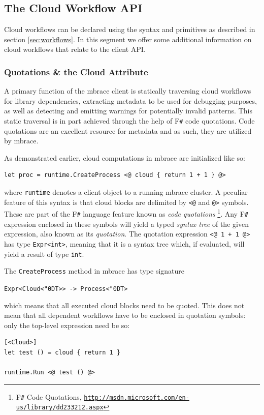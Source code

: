 \documentclass[9pt,a4paper]{article}
\newcommand{\mbrace}{mbrace}
\newcommand{\fsharp}{F\texttt \#}
\newcommand{\samehref}[1]{\href{#1}{\texttt{#1}}}
\newcommand{\centertt}[1]{\begin{center}\texttt{#1}\end{center}}
\newcommand{\uq}{\char"0D}
\begin{document}
\subsection{The Cloud Workflow API}
\label{sec:client:workflows}

Cloud workflows can be declared using the syntax and primitives as described in section \ref{sec:workflows}.
In this segment we offer some additional information on cloud workflows that relate to the client API.

\subsubsection*{Quotations \& the Cloud Attribute}

A primary function of the \mbrace{} client is statically traversing cloud workflows 
for library dependencies, extracting metadata to be used for debugging purposes,
as well as detecting and emitting warnings for potentially invalid patterns. 
This static traversal is in part achieved through the help of \fsharp{} code quotations.
Code quotations are an excellent resource for metadata and as such, they are utilized by \mbrace{}.

As demonstrated earlier, cloud computations in \mbrace{} are initialized like so:
\begin{lstlisting}
let proc = runtime.CreateProcess <@ cloud { return 1 + 1 } @>
\end{lstlisting}
where \texttt{runtime} denotes a client object to a running \mbrace{} cluster.
A peculiar feature of this syntax is that cloud blocks are delimited by \texttt{<@} and 
\texttt{@>} symbols. These are part of the \fsharp{} language feature known as \emph{code quotations}%
\footnote{\fsharp{} Code Quotations, \samehref{http://msdn.microsoft.com/en-us/library/dd233212.aspx}}.
Any \fsharp{} expression enclosed in these symbols will yield a
typed \emph{syntax tree} of the given expression, also known as its \emph{quotation}.
The quotation expression \texttt{<@ 1 + 1 @>} has type \texttt{Expr<int>}, 
meaning that it is a syntax tree which, if evaluated, 
will yield a result of type \texttt{int}.

The \texttt{CreateProcess} method in \mbrace{} has type signature
\centertt{Expr<Cloud<\uq{}T>> -> Process<\uq{}T>}
which means that all executed cloud blocks need to be quoted.
This does not mean that all dependent workflows have to be enclosed in quotation symbols:
only the top-level expression need be so:
\begin{lstlisting}
[<Cloud>]
let test () = cloud { return 1 }

runtime.Run <@ test () @>
\end{lstlisting}
\end{document}

